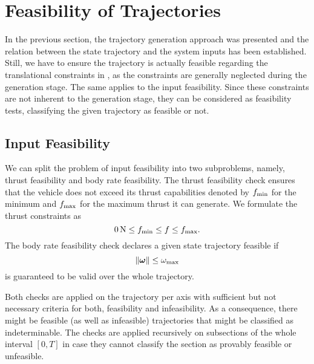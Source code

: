     
\section{Feasibility of Trajectories}
\label{sec:feasibility}
In the previous section, the trajectory generation approach was presented and the relation between the state trajectory and the system inputs has been established.
Still, we have to ensure the trajectory is actually feasible regarding the translational constraints in , as the constraints are generally neglected during the generation stage.
The same applies to the input feasibility.
Since these constraints are not inherent to the generation stage, they can be considered as feasibility tests, classifying the given trajectory as feasible or not. 

\subsection{Input Feasibility}
\label{sec:input-feasibility}

We can split the problem of input feasibility into two subproblems, namely, thrust feasibility and body rate feasibility. The thrust feasibility check ensures that the vehicle does not exceed its thrust capabilities denoted by $\mbox{$f_\text{min}$}$ for the minimum and $\mbox{$f_\text{max}$}$ for the maximum thrust it can generate.
We formulate the thrust constraints as
\begin{equation}
	\label{eq:thrust-limits}
	\unit[0]{N} \leq f_\text{min} \leq f \leq f_\text{max}
	.
\end{equation}
The body rate feasibility check declares a given state trajectory feasible if
\begin{equation}
	\label{eq:body-rates-limit}
	\left\lVert\mbox{$\bm{\omega}$}\right\rVert
	\leq
	\omega_\text{max}
\end{equation}
is guaranteed to be valid over the whole trajectory.

Both checks are applied on the trajectory per axis with sufficient but not necessary criteria for both, feasibility and infeasibility. As a consequence, there might be feasible (as well as infeasible) trajectories that might be classified as indeterminable. The checks are applied recursively on subsections of the whole interval $\left[0,T\right]$ in case they cannot classify the section as provably feasible or unfeasible.

